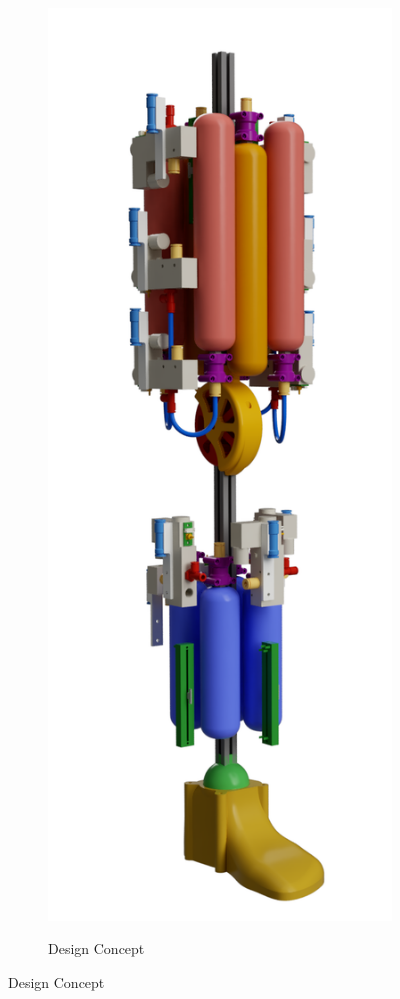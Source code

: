 \documentclass[11pt,a4paper]{article}
\begin{document}
\begin{figure}[!hbt]
\begin{subfigure}[t]{0.4 \textwidth}
        \label{fig:platform_side}
    \end{subfigure}
    \begin{subfigure}[t]{0.4 \textwidth}
        \centering
        \caption{Design Concept}
        \includegraphics[scale=0.2]{Leg_Render.PNG}
        \label{fig:platform_angle}
    \end{subfigure}
    

\end{figure}
\end{document}
